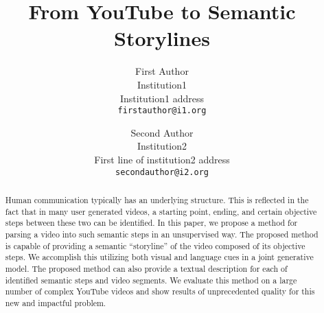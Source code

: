\documentclass[10pt,twocolumn,letterpaper]{article}
\begin{document}
\title{From YouTube to Semantic Storylines}


\author{First Author\\
Institution1\\
Institution1 address\\
{\tt\small firstauthor@i1.org}
\and
Second Author\\
Institution2\\
First line of institution2 address\\
{\tt\small secondauthor@i2.org}
}

\maketitle


\begin{abstract}
Human communication typically has an underlying structure. This is reflected in the fact that in many user generated videos, a starting point, ending, and certain objective steps between these two can be identified. In this paper, we propose a method for parsing a video into such semantic steps in an unsupervised way. The proposed method is capable of providing a semantic ``storyline'' of the video composed of its objective steps. We accomplish this utilizing both visual and language cues in a joint generative model. The proposed method can also provide a textual description for each of identified semantic steps and video segments. We evaluate this method on a large number of complex YouTube videos and show results of unprecedented quality for this new and impactful problem.
\end{abstract}








%

{\small


}
\end{document}
